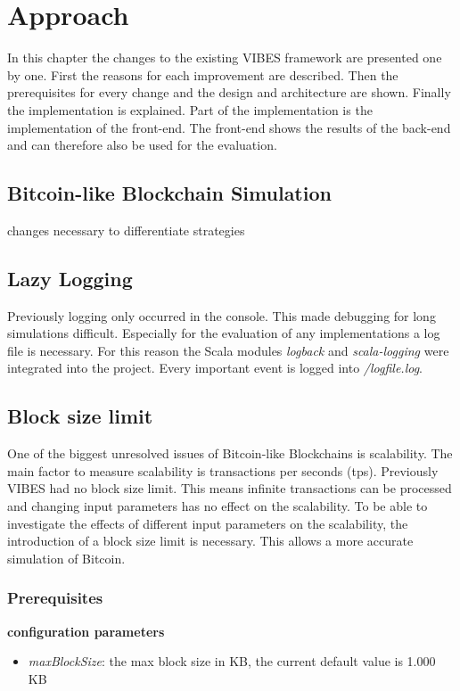 \chapter{Approach}\label{chapter:approach}
In this chapter the changes to the existing VIBES framework are presented one by one. First the reasons for each improvement are described. Then the prerequisites for every change and the design and architecture are shown. Finally the implementation is explained. Part of the implementation is the implementation of the front-end. The front-end shows the results of the back-end and can therefore also be used for the evaluation.

\section{Bitcoin-like Blockchain Simulation}
changes necessary to differentiate strategies

\section{Lazy Logging}
Previously logging only occurred in the console. This made debugging for long simulations difficult. Especially for the evaluation of any implementations a log file is necessary. For this reason the Scala modules \textit{logback} and \textit{scala-logging} were integrated into the project. Every important event is logged into \textit{/logfile.log}.

\section{Block size limit}
One of the biggest unresolved issues of Bitcoin-like Blockchains is scalability. The main factor to measure scalability is transactions per seconds (tps). Previously VIBES had no block size limit. This means infinite transactions can be processed and changing input parameters has no effect on the scalability. To be able to investigate the effects of different input parameters on the scalability, the introduction of a block size limit is necessary. This allows a more accurate simulation of Bitcoin.

\subsection{Prerequisites}
\textbf{configuration parameters}

\begin{itemize}
\item \textit{maxBlockSize}: the max block size in KB, the current default value is 1.000 KB
\end{itemize}

